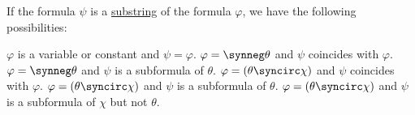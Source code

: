 \begin{lemma}\label{thm:propositional_subformula_lemma}
  If the formula \( \psi \) is a \hyperref[def:formal_language/substring]{substring} of the formula \( \varphi \), we have the following possibilities:
  \begin{thmenum}
     \( \varphi \) is a variable or constant and \( \psi = \varphi \).
     \( \varphi = \synneg \theta \) and \( \psi \) coincides with \( \varphi \).
     \( \varphi = \synneg \theta \) and \( \psi \) is a subformula of \( \theta \).
     \( \varphi = (\theta \syncirc \chi) \) and \( \psi \) coincides with \( \varphi \).
     \( \varphi = (\theta \syncirc \chi) \) and \( \psi \) is a subformula of \( \theta \).
     \( \varphi = (\theta \syncirc \chi) \) and \( \psi \) is a subformula of \( \chi \) but not \( \theta \).
  \end{thmenum}
\end{lemma}

